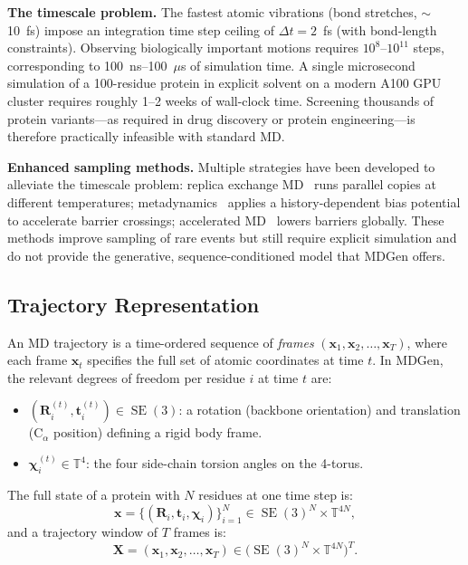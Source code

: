 \documentclass[11pt,a4paper]{article}
\DeclareMathOperator{\SE}{SE}
\newcommand{\bx}{\mathbf{x}}
\newcommand{\bX}{\mathbf{X}}
\newcommand{\bR}{\mathbf{R}}
\newcommand{\bt}{\mathbf{t}}
\newcommand{\TT}{\mathbb{T}}
\begin{document}
\textbf{The timescale problem.}  The fastest atomic vibrations (bond stretches, $\sim$10~fs) impose
an integration time step ceiling of $\Delta t = 2$~fs (with bond-length constraints).  Observing
biologically important motions requires $10^8$--$10^{11}$ steps, corresponding to
100~ns--100~$\mu$s of simulation time.  A single microsecond simulation of a 100-residue protein
in explicit solvent on a modern A100 GPU cluster requires roughly 1--2 weeks of wall-clock time.
Screening thousands of protein variants---as required in drug discovery or protein engineering---is
therefore practically infeasible with standard MD.

\textbf{Enhanced sampling methods.}  Multiple strategies have been developed to alleviate the
timescale problem: replica exchange MD~\cite{sugita1999} runs parallel copies at different
temperatures; metadynamics~\cite{laio2002} applies a history-dependent bias potential to accelerate
barrier crossings; accelerated MD~\cite{hamelberg2004} lowers barriers globally.  These methods
improve sampling of rare events but still require explicit simulation and do not provide the
generative, sequence-conditioned model that MDGen offers.

\subsection{Trajectory Representation}

An MD trajectory is a time-ordered sequence of \emph{frames} $(\bx_1, \bx_2, \ldots, \bx_T)$,
where each frame $\bx_t$ specifies the full set of atomic coordinates at time $t$.  In MDGen, the
relevant degrees of freedom per residue $i$ at time $t$ are:
\begin{itemize}[leftmargin=2em]
  \item $(\bR_i^{(t)}, \bt_i^{(t)}) \in \SE(3)$: a rotation (backbone orientation) and
    translation ($\text{C}_\alpha$ position) defining a rigid body frame.
  \item $\bm\chi_i^{(t)} \in \TT^4$: the four side-chain torsion angles on the 4-torus.
\end{itemize}
The full state of a protein with $N$ residues at one time step is:
\begin{equation}
  \bx = \{(\bR_i, \bt_i, \bm\chi_i)\}_{i=1}^N \in \SE(3)^N \times \TT^{4N},
\end{equation}
and a trajectory window of $T$ frames is:
\begin{equation}
  \bX = (\bx_1, \bx_2, \ldots, \bx_T) \in \bigl(\SE(3)^N \times \TT^{4N}\bigr)^T.
  \label{eq:trajectory}
\end{equation}
\end{document}
